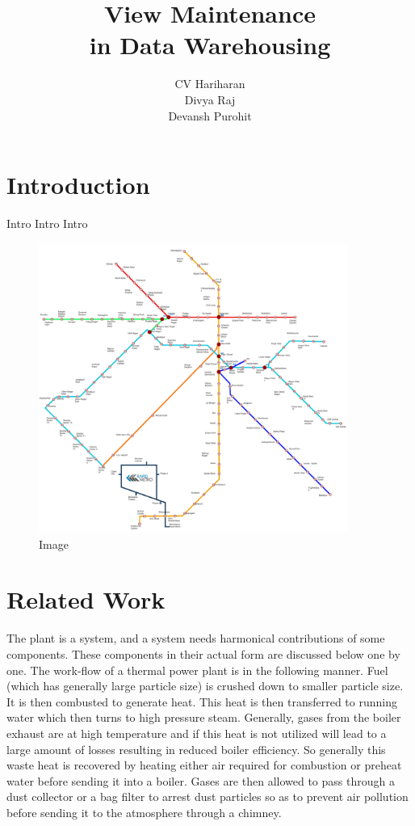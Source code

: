 \documentclass{report}
\title{\textbf{\Huge View Maintenance \\ in Data Warehousing } }
\author{CV Hariharan \bullet 1610110 \\ Divya Raj \bullet 1610110123 \\ Devansh Purohit \bullet 1610110429}
\date{}
\begin{document}
\maketitle
\tableofcontents
\newpage
\renewcommand{\thesection}{\arabic{section}}
\section{Introduction}
Intro Intro Intro
\begin{figure}[H]
\centering \includegraphics[width=0.9\textwidth]{images/pic1.jpg}
\caption{Image}
\end{figure}

\section{Related Work}
The plant is a system, and a system needs harmonical contributions of some components. These components in their actual form are discussed below one by one. The work-flow of a thermal power plant is in the following manner. Fuel (which has generally large particle size) is crushed down to smaller particle size. It is then combusted to generate heat. This heat is then transferred to running water which then turns to high pressure steam. Generally, gases from the boiler exhaust are at high temperature and if this heat is not utilized will lead to a large amount of losses resulting in reduced boiler efficiency. So generally this waste heat is recovered by heating either air required for combustion or preheat water before sending it into a boiler. Gases are then allowed to pass through a dust collector or a bag filter to arrest dust particles so as to prevent air pollution before sending it to the atmosphere through a chimney.
\end{document}
